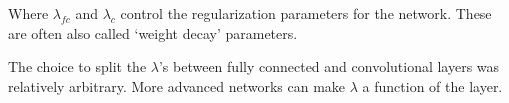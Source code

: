   Where $\lambda_{fc}$ and $\lambda_{c}$ control the regularization parameters
  for the network. These are often also called `weight decay' parameters.

  The choice to split the $\lambda$'s between fully connected and convolutional
  layers was relatively arbitrary. More advanced networks can make $\lambda$
  a function of the layer. 




